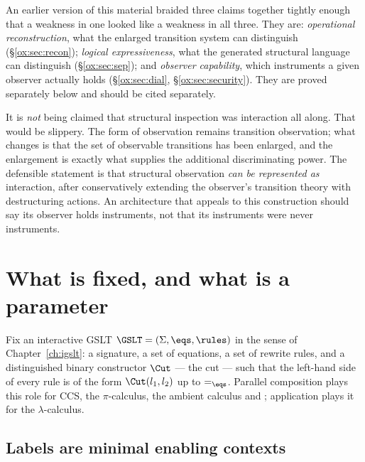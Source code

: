 \begin{remark}
\label{ox:rem:three}
An earlier version of this material braided three claims together tightly enough
that a weakness in one looked like a weakness in all three. They are:
\emph{operational reconstruction}, what the enlarged transition system can
distinguish (\S\ref{ox:sec:recon}); \emph{logical expressiveness}, what the
generated structural language can distinguish (\S\ref{ox:sec:sep}); and
\emph{observer capability}, which instruments a given observer actually holds
(\S\ref{ox:sec:dial}, \S\ref{ox:sec:security}). They are proved separately below
and should be cited separately.
\end{remark}

\begin{remark}
\label{ox:rem:notclaim}
It is \emph{not} being claimed that structural inspection was interaction all
along. That would be slippery. The form of observation remains transition
observation; what changes is that the set of observable transitions has been
enlarged, and the enlargement is exactly what supplies the additional
discriminating power. The defensible statement is that structural observation
\emph{can be represented as} interaction, after conservatively extending the
observer's transition theory with destructuring actions. An architecture that
appeals to this construction should say its observer holds instruments, not that
its instruments were never instruments.
\end{remark}

\section{What is fixed, and what is a parameter}
\label{ox:sec:prelim}

Fix an interactive GSLT $\GSLT = (\Sigma, \eqs, \rules)$ in the sense of
Chapter~\ref{ch:igslt}: a signature, a set of equations, a set of rewrite rules,
and a distinguished binary constructor $\Cut$ --- the cut --- such that the
left-hand side of every rule is of the form $\Cut(l_1,l_2)$ up to $=_{\eqs}$.
Parallel composition plays this role for CCS, the $\pi$-calculus, the ambient
calculus and \rhoc; application plays it for the $\lambda$-calculus.

\subsection{Labels are minimal enabling contexts}

